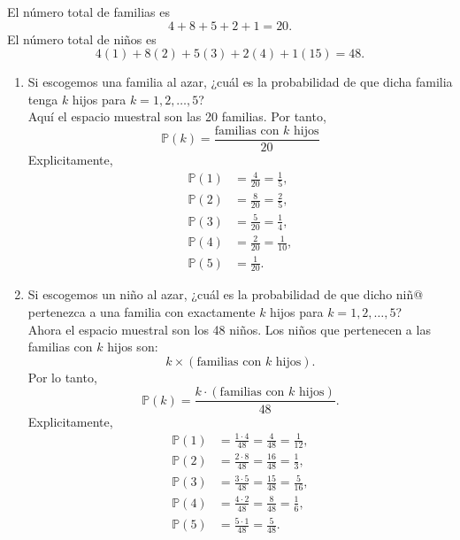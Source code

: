 \documentclass[12pt,a4paper]{article}
\begin{document}
    \begin{solucion}
        El número total de familias es
        \begin{equation*}
            4+8+5+2+1=20.
        \end{equation*}
        El número total de niños es
        \begin{equation*}
            4(1)+8(2)+5(3)+2(4)+1(15)=48.
        \end{equation*}
        \begin{enumerate}
            \item[(a)] Si escogemos una familia al azar, ¿cuál es la probabilidad de que dicha familia tenga $k$ hijos para $k=1,2,\dots,5$?\\
            Aquí el espacio muestral son las 20 familias. Por tanto,
            \begin{equation*}
                \mathbb{P}(k)=\frac{\text{familias con }k\text{ hijos}}{20}
            \end{equation*}
            Explicitamente,
            \begin{align*}
                \mathbb{P}(1)&=\frac{4}{20}=\frac{1}{5},\\
                \mathbb{P}(2)&=\frac{8}{20}=\frac{2}{5},\\
                \mathbb{P}(3)&=\frac{5}{20}=\frac{1}{4},\\
                \mathbb{P}(4)&=\frac{2}{20}=\frac{1}{10},\\
                \mathbb{P}(5)&=\frac{1}{20}.
            \end{align*}
            \item[(b)] Si escogemos un niño al azar, ¿cuál es la probabilidad de que dicho niñ@ pertenezca a una familia con exactamente $k$ hijos para $k=1,2,\dots,5$?\\
            Ahora el espacio muestral son los 48 niños. Los niños que pertenecen a las familias con $k$ hijos son:
            \begin{equation*}
                k\times(\text{familias con }k\text{ hijos}).
            \end{equation*}
            Por lo tanto,
            \begin{equation*}
                \mathbb{P}(k)=\frac{k\cdot(\text{familias con }k\text{ hijos})}{48}.
            \end{equation*}
            Explicitamente,
            \begin{align*}
                \mathbb{P}(1)&=\frac{1\cdot4}{48}=\frac{4}{48}=\frac{1}{12},\\
                \mathbb{P}(2)&=\frac{2\cdot8}{48}=\frac{16}{48}=\frac{1}{3},\\
                \mathbb{P}(3)&=\frac{3\cdot5}{48}=\frac{15}{48}=\frac{5}{16},\\
                \mathbb{P}(4)&=\frac{4\cdot2}{48}=\frac{8}{48}=\frac{1}{6},\\
                \mathbb{P}(5)&=\frac{5\cdot1}{48}=\frac{5}{48}.
            \end{align*}
        \end{enumerate}
    \end{solucion}
    
\end{document}
